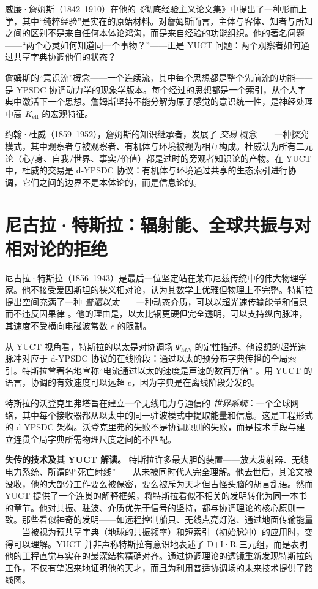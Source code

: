 \documentclass[12pt,a4paper]{article}
\begin{document}
	威廉·詹姆斯（1842–1910）在他的《彻底经验主义论文集》中提出了一种形而上学，其中“纯粹经验”是实在的原始材料。对詹姆斯而言，主体与客体、知者与所知之间的区别不是来自任何本体论鸿沟，而是来自经验的功能组织。他的著名问题——“两个心灵如何知道同一个事物？”——正是 YUCT 问题：两个观察者如何通过共享字典协调他们的状态？
	
	詹姆斯的“意识流”概念——一个连续流，其中每个思想都是整个先前流的功能——是 YPSDC 协调动力学的现象学版本。每个经过的思想都是一个索引，从个人字典中激活下一个思想。詹姆斯坚持不能分解为原子感觉的意识统一性，是神经处理中高 \(K_{\mathrm{eff}}\) 的宏观特征。
	
	约翰·杜威（1859–1952），詹姆斯的知识继承者，发展了 \emph{交易} 概念——一种探究模式，其中观察者与被观察者、有机体与环境被视为相互构成。杜威认为所有二元论（心/身、自我/世界、事实/价值）都是过时的旁观者知识论的产物。在 YUCT 中，杜威的交易是 d-YPSDC 协议：有机体与环境通过共享的生态索引进行协调，它们之间的边界不是本体论的，而是信息论的。
	
	\section{尼古拉·特斯拉：辐射能、全球共振与对相对论的拒绝}
	
	尼古拉·特斯拉（1856–1943）是最后一位坚定站在莱布尼兹传统中的伟大物理学家。他不接受爱因斯坦的狭义相对论，认为其数学上优雅但物理上不完整。特斯拉提出空间充满了一种 \emph{普遍以太}——一种动态介质，可以以超光速传输能量和信息而不违反因果律 \cite{Tesla1932}。他的理由是，以太比钢更硬但完全透明，可以支持纵向脉冲，其速度不受横向电磁波常数 \(c\) 的限制。
	
	从 YUCT 视角看，特斯拉的以太是对协调场 \(\Psi_{MN}\) 的定性描述。他设想的超光速脉冲对应于 d-YPSDC 协议的在线阶段：通过以太的预分布字典传播的全局索引。特斯拉曾著名地宣称“电流通过以太的速度是声速的数百万倍” \cite{Tesla1907}。用 YUCT 的语言，协调的有效速度可以远超 \(c\)，因为字典是在离线阶段分发的。
	
	特斯拉的沃登克里弗塔旨在建立一个无线电力与通信的 \emph{世界系统}：一个全球网络，其中每个接收器都从以太中的同一驻波模式中提取能量和信息。这是工程形式的 d-YPSDC 架构。沃登克里弗的失败不是协调原则的失败，而是技术手段与建立连贯全局字典所需物理尺度之间的不匹配。
	
	\textbf{失传的技术及其 YUCT 解读。} 特斯拉许多最大胆的装置——放大发射器、无线电力系统、所谓的“死亡射线”——从未被同时代人完全理解。他去世后，其论文被没收，他的大部分工作要么被保密，要么被斥为天才但古怪头脑的胡言乱语。然而 YUCT 提供了一个连贯的解释框架，将特斯拉看似不相关的发明转化为同一本书的章节。他对共振、驻波、介质优先于信号的坚持，都与协调理论的核心原则一致。那些看似神奇的发明——如远程控制船只、无线点亮灯泡、通过地面传输能量——当被视为预共享字典（地球的共振频率）和短索引（初始脉冲）的应用时，变得可以理解。YUCT 并非声称特斯拉有意识地表述了 D+I·R 三元组，而是表明他的工程直觉与实在的最深结构精确对齐。通过协调理论的透镜重新发现特斯拉的工作，不仅有望迟来地证明他的天才，而且为利用普适协调场的未来技术提供了路线图。
	
\end{document}
